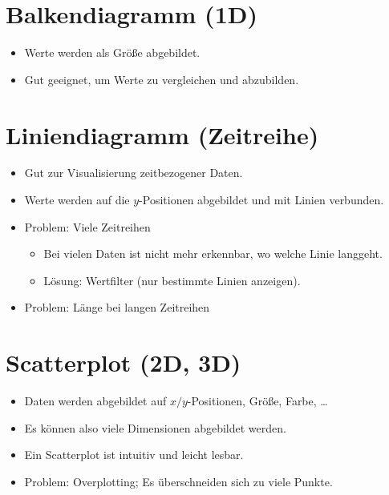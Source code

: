 	\section{Balkendiagramm (1D)}
		\begin{itemize}
			\item Werte werden als Größe abgebildet.
			\item Gut geeignet, um Werte zu vergleichen und abzubilden.
		\end{itemize}

	\section{Liniendiagramm (Zeitreihe)}
		\begin{itemize}
			\item Gut zur Visualisierung zeitbezogener Daten.
			\item Werte werden auf die \(y\)-Positionen abgebildet und mit Linien verbunden.
			\item Problem: Viele Zeitreihen
				\begin{itemize}
					\item Bei vielen Daten ist nicht mehr erkennbar, wo welche Linie langgeht.
					\item Lösung: Wertfilter (nur bestimmte Linien anzeigen).
				\end{itemize}
			\item Problem: Länge bei langen Zeitreihen
		\end{itemize}

	\section{Scatterplot (2D, 3D)}
		\begin{itemize}
			\item Daten werden abgebildet auf \(x/y\)-Positionen, Größe, Farbe, \dots
			\item Es können also viele Dimensionen abgebildet werden.
			\item Ein Scatterplot ist intuitiv und leicht lesbar.
			\item Problem: Overplotting; Es überschneiden sich zu viele Punkte.
		\end{itemize}

